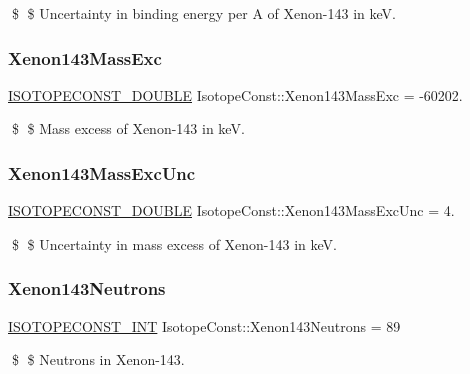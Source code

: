 \$ \$ Uncertainty in binding energy per A of Xenon-\/143 in keV. \mbox{\label{group___isotope_const-_xenon-_xe143_gad63147130e20cbb4dd5285f4db313009}} 
\subsubsection{\texorpdfstring{Xenon143\+Mass\+Exc}{Xenon143MassExc}}
{\footnotesize\ttfamily \mbox{\hyperlink{group___isotope_const-_macros_ga8f45a7272ce02c0b4c65c44636ed719a}{I\+S\+O\+T\+O\+P\+E\+C\+O\+N\+S\+T\+\_\+\+D\+O\+U\+B\+LE}} Isotope\+Const\+::\+Xenon143\+Mass\+Exc = -\/60202.}

\$ \$ Mass excess of Xenon-\/143 in keV. \mbox{\label{group___isotope_const-_xenon-_xe143_ga7ad621b4f6e7bb8a548fae2376daaaaf}} 
\subsubsection{\texorpdfstring{Xenon143\+Mass\+Exc\+Unc}{Xenon143MassExcUnc}}
{\footnotesize\ttfamily \mbox{\hyperlink{group___isotope_const-_macros_ga8f45a7272ce02c0b4c65c44636ed719a}{I\+S\+O\+T\+O\+P\+E\+C\+O\+N\+S\+T\+\_\+\+D\+O\+U\+B\+LE}} Isotope\+Const\+::\+Xenon143\+Mass\+Exc\+Unc = 4.}

\$ \$ Uncertainty in mass excess of Xenon-\/143 in keV. \mbox{\label{group___isotope_const-_xenon-_xe143_gae2c3fc3791abc6c897ef66b4c83d4c23}} 
\subsubsection{\texorpdfstring{Xenon143\+Neutrons}{Xenon143Neutrons}}
{\footnotesize\ttfamily \mbox{\hyperlink{group___isotope_const-_macros_ga5f18360b3e99483a35c32d789e62621c}{I\+S\+O\+T\+O\+P\+E\+C\+O\+N\+S\+T\+\_\+\+I\+NT}} Isotope\+Const\+::\+Xenon143\+Neutrons = 89}

\$ \$ Neutrons in Xenon-\/143. \mbox{\label{group___isotope_const-_xenon-_xe143_ga33759bfe517d7d82c5cb967e6dfae2e8}} 
